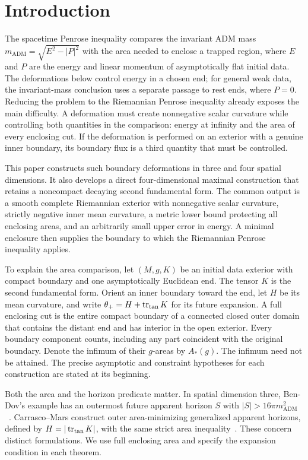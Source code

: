 \section{Introduction}\label{b:introduction}

The spacetime Penrose inequality compares the invariant ADM mass
$m_{\mathrm{ADM}}=\sqrt{E^2-|P|^2}$ with the area needed to enclose a trapped
region, where $E$ and $P$ are the energy and linear momentum of
asymptotically flat initial data.  The deformations below control energy
in a chosen end; for general weak data, the invariant-mass conclusion
uses a separate passage to rest ends, where $P=0$.
Reducing the problem to the Riemannian Penrose inequality already
exposes the main difficulty.  A deformation must create nonnegative scalar
curvature while controlling both quantities in the comparison: energy
at infinity and the area of every enclosing cut.  If the deformation is
performed on an exterior with a genuine inner boundary, its boundary
flux is a third quantity that must be controlled.

This paper constructs such boundary deformations in three and four
spatial dimensions.  It also develops a direct four-dimensional maximal
construction that retains a noncompact decaying second fundamental form.
The common output is a smooth complete Riemannian exterior with
nonnegative scalar curvature, strictly negative inner mean curvature,
a metric lower bound protecting all enclosing areas, and an arbitrarily
small upper error in energy.  A minimal enclosure then supplies the
boundary to which the Riemannian Penrose inequality applies.

To explain the area comparison, let $(M,g,K)$ be an initial data exterior
with compact boundary and one asymptotically Euclidean end.  The tensor
$K$ is the second fundamental form.  Orient an inner boundary toward
the end, let $H$ be its mean curvature, and write
$\theta_+=H+\operatorname{tr}_{\mathrm{tan}}K$ for its future expansion.
A full enclosing cut is the entire compact boundary of a connected
closed outer domain that contains the distant end and has interior in
the open exterior.  Every boundary component counts, including any
part coincident with the original boundary.  Denote the infimum of their
$g$-areas by $A_*(g)$.  The infimum need not be attained.
The precise asymptotic and constraint hypotheses for each construction
are stated at its beginning.

Both the area and the horizon predicate matter. In spatial dimension
three, Ben-Dov's example
has an outermost future apparent horizon $S$ with
$|S|>16\pi m_{\mathrm{ADM}}^2$~\cite{BenDov2004}.
Carrasco--Mars construct outer area-minimizing generalized apparent
horizons, defined by $H=|\operatorname{tr}_{\mathrm{tan}}K|$, with the same strict area
inequality~\cite{CarrascoMars2010}.
These concern distinct formulations.  We use full enclosing area and
specify the expansion condition in each theorem.

